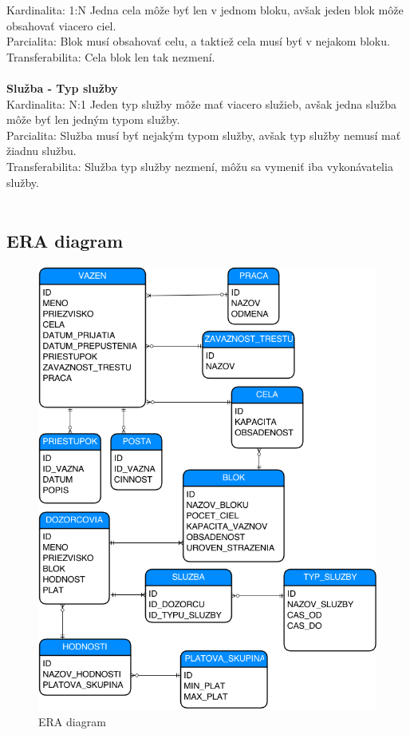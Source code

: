 \documentclass[slovak, 12pt, Times New Roman]{article}
\begin{document}
				Kardinalita: 1:N Jedna cela môže byť len v jednom bloku, avšak jeden blok môže obsahovať viacero ciel.\\
				Parcialita: Blok musí obsahovať celu, a taktiež cela musí byť v nejakom bloku.\\ 
				Transferabilita: Cela blok len tak nezmení.\\ \\
			\textbf{Služba - Typ služby} \\
				Kardinalita: N:1 Jeden typ služby môže mať viacero služieb, avšak jedna služba môže byť len jedným typom služby.\\
				Parcialita: Služba musí byť nejakým typom služby, avšak typ služby nemusí mať žiadnu službu.\\ 
				Transferabilita: Služba typ služby nezmení, môžu sa vymeniť iba vykonávatelia služby.\\ \\
		\clearpage
		\subsection{ERA diagram}
			\begin{figure}[!htb]
				\centering
				\includegraphics[scale=0.6]{ERAdia.png}
				\caption{ERA diagram}
				\label{fig:Reinforcement}
			\end{figure}
\end{document}
